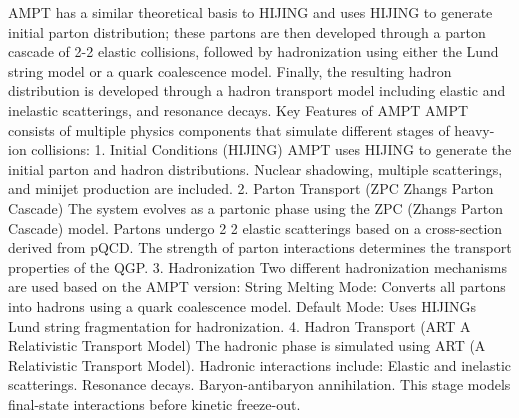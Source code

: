 AMPT has a similar theoretical basis to HIJING and uses HIJING to generate initial parton distribution; these partons are then developed through a parton cascade of 2-2 elastic collisions, followed by hadronization using either the Lund string model or a quark coalescence model. 
Finally, the resulting hadron distribution is developed through a hadron transport model including elastic and inelastic scatterings, and resonance decays.
Key Features of AMPT
AMPT consists of multiple physics components that simulate different stages of heavy-ion collisions:
1. Initial Conditions (HIJING)
AMPT uses HIJING to generate the initial parton and hadron distributions.
Nuclear shadowing, multiple scatterings, and minijet production are included.
2. Parton Transport (ZPC Zhangs Parton Cascade)
The system evolves as a partonic phase using the ZPC (Zhangs Parton Cascade) model.
Partons undergo 2 2 elastic scatterings based on a cross-section derived from pQCD.
The strength of parton interactions determines the transport properties of the QGP.
3. Hadronization
Two different hadronization mechanisms are used based on the AMPT version:
String Melting Mode: Converts all partons into hadrons using a quark coalescence model.
Default Mode: Uses HIJINGs Lund string fragmentation for hadronization.
4. Hadron Transport (ART A Relativistic Transport Model)
The hadronic phase is simulated using ART (A Relativistic Transport Model).
Hadronic interactions include:
Elastic and inelastic scatterings.
Resonance decays.
Baryon-antibaryon annihilation.
This stage models final-state interactions before kinetic freeze-out.


